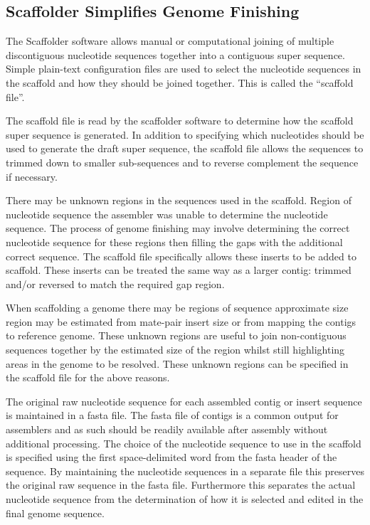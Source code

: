 \documentclass[10pt]{bmc_article}
\newenvironment{bmcformat}{\begin{raggedright}\baselineskip20pt\sloppy\setboolean{publ}{false}}{\end{raggedright}\baselineskip20pt\sloppy}
\begin{document}
\begin{bmcformat}
\subsection*{Scaffolder Simplifies Genome Finishing} %

The Scaffolder software allows manual or computational joining of multiple
discontiguous nucleotide sequences together into a contiguous super sequence.
Simple plain-text configuration files are used to select the nucleotide
sequences in the scaffold and how they should be joined together. This is
called the ``scaffold file''. \pb

The scaffold file is read by the scaffolder software to determine how the
scaffold super sequence is generated. In addition to specifying which
nucleotides should be used to generate the draft super sequence, the scaffold
file allows the sequences to trimmed down to smaller sub-sequences and to
reverse complement the sequence if necessary. \pb

There may be unknown regions in the sequences used in the scaffold. Region of
nucleotide sequence the assembler was unable to determine the nucleotide
sequence. The process of genome finishing may involve determining the correct
nucleotide sequence for these regions then filling the gaps with the additional
correct sequence. The scaffold file specifically allows these inserts to be
added to scaffold. These inserts can be treated the same way as a larger
contig: trimmed and/or reversed to match the required gap region. \pb

When scaffolding a genome there may be regions of sequence approximate size
region may be estimated from mate-pair insert size or from mapping the contigs
to reference genome. These unknown regions are useful to join non-contiguous
sequences together by the estimated size of the region whilst still
highlighting areas in the genome to be resolved. These unknown regions can be
specified in the scaffold file for the above reasons. \pb

The original raw nucleotide sequence for each assembled contig or insert
sequence is maintained in a fasta file. The fasta file of contigs is a common
output for assemblers and as such should be readily available after assembly
without additional processing. The choice of the nucleotide sequence to use in
the scaffold is specified using the first space-delimited word from the fasta
header of the sequence. By maintaining the nucleotide sequences in a separate
file this preserves the original raw sequence in the fasta file. Furthermore
this separates the actual nucleotide sequence from the determination of how it
is selected and edited in the final genome sequence. \pb


\end{bmcformat}
\end{document}
